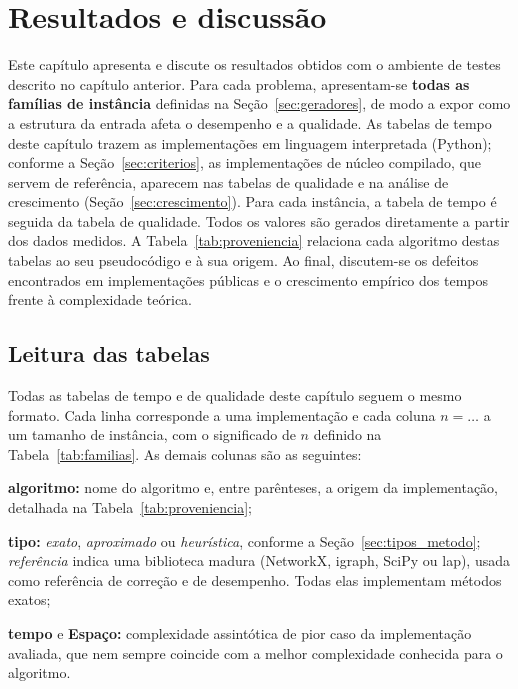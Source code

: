
\chapter{Resultados e discussão}
\label{cap:resultados}

Este capítulo apresenta e discute os resultados obtidos com o ambiente de testes
descrito no capítulo anterior. Para cada problema, apresentam-se \textbf{todas as
famílias de instância} definidas na Seção~\ref{sec:geradores}, de modo a expor
como a estrutura da entrada afeta o desempenho e a qualidade. As tabelas de tempo
deste capítulo trazem as implementações em linguagem interpretada (Python);
conforme a Seção~\ref{sec:criterios}, as implementações de núcleo compilado, que
servem de referência, aparecem nas tabelas de qualidade e na análise de
crescimento (Seção~\ref{sec:crescimento}). Para
cada instância, a tabela de tempo é seguida da tabela de qualidade. Todos os valores são gerados
diretamente a partir dos dados medidos. A Tabela~\ref{tab:proveniencia} relaciona cada
algoritmo destas tabelas ao seu pseudocódigo e à sua origem. Ao final, discutem-se os defeitos
encontrados em implementações públicas e o crescimento empírico dos tempos frente
à complexidade teórica.

\section{Leitura das tabelas}
\label{sec:leitura_tabelas}

Todas as tabelas de tempo e de qualidade deste capítulo
seguem o mesmo formato. Cada linha corresponde a uma implementação e cada coluna
$n = \dots$ a um tamanho de instância, com o significado de $n$ definido na
Tabela~\ref{tab:familias}. As demais colunas são as seguintes:

\begin{alineas}
    \item \textbf{algoritmo:} nome do algoritmo e, entre parênteses, a origem da
    implementação, detalhada na Tabela~\ref{tab:proveniencia};
    \item \textbf{tipo:} \textit{exato}, \textit{aproximado} ou \textit{heurística},
    conforme a Seção~\ref{sec:tipos_metodo}; \textit{referência} indica uma
    biblioteca madura (NetworkX, igraph, SciPy ou lap), usada como referência de
    correção e de desempenho. Todas elas implementam métodos exatos;
    \item \textbf{tempo} e \textbf{Espaço:} complexidade assintótica de pior caso
    da implementação avaliada, que nem sempre coincide com a melhor complexidade
    conhecida para o algoritmo.
\end{alineas}

